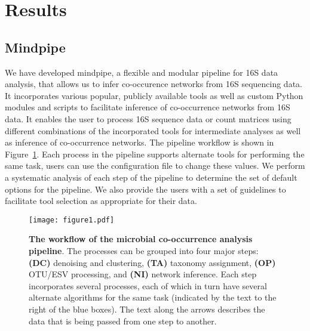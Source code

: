 
\section*{Results}

  \subsection*{Mindpipe}

  We have developed mindpipe, a flexible and modular pipeline for 16S data analysis, that allows us to infer co-occurence networks from 16S sequencing data.
  It incorporates various popular, publicly available tools as well as custom Python modules and scripts to facilitate inference of co-occurrence networks from 16S data.
  It enables the user to process 16S sequence data or count matrices using different combinations of the incorporated tools for intermediate analyses as well as inference of co-occurrence networks.
  The pipeline workflow is shown in Figure~\ref{fig:figure1}.
  Each process in the pipeline supports alternate tools for performing the same task, users can use the configuration file to change these values.
  We perform a systematic analysis of each step of the pipeline to determine the set of default options for the pipeline.
  We also provide the users with a set of guidelines to facilitate tool selection as appropriate for their data.


  \begin{figure}[h]
    \centering
    \texttt{[image: figure1.pdf]}
    \caption{
      \textbf{The workflow of the microbial co-occurrence analysis pipeline}.
      The processes can be grouped into four major steps: \textbf{(DC)} denoising and clustering, \textbf{(TA)} taxonomy assignment, \textbf{(OP)} OTU/ESV processing, and \textbf{(NI)} network inference.
      Each step incorporates several processes, each of which in turn have several alternate algorithms for the same task (indicated by the text to the right of the blue boxes).
      The text along the arrows describes the data that is being passed from one step to another.
    }
    \label{fig:figure1}
  \end{figure}

